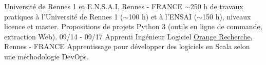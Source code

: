 \documentclass[]{friggeri-cv}
\begin{document}
\begin{entrylist}
 {Université de Rennes 1 et E.N.S.A.I, Rennes - FRANCE}
 {$\sim$250 h de travaux pratiques à l’Université de Rennes 1 ($\sim$100 h) et à l’ENSAI ($\sim$150 h), niveaux licence et master. Propositions de projets Python 3 (outils en ligne de commande, extraction Web).}
 \entry
 {09/14 - 09/17}
 {Apprenti Ingénieur Logiciel}
 {\href{http://www.orange.com/en/home}{Orange Recherche}, Rennes - FRANCE}
 {Apprentissage pour développer des logiciels en Scala selon une méthodologie DevOps.%
 }
 \vspace{-2.5em}
\end{entrylist}

\end{document}
